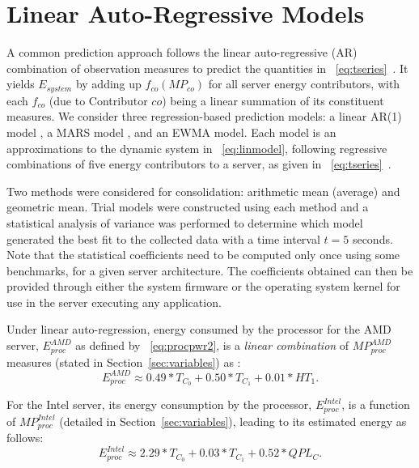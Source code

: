 \section{Linear Auto-Regressive Models}
\label{sec:linear-auto}

A common prediction approach follows the linear auto-regressive (AR)
combination of observation measures to predict the quantities in
\equationname~\eqref{eq:tseries}\ \cite{Lewis2008}.
It yields $E_{system}$ by adding up $f_{co}(MP_{co})$ for all server energy
contributors, with each $f_{co}$ (due to Contributor $co$) being a
linear summation of its constituent measures.
We consider three regression-based prediction models: a linear
AR(1) model \cite{Box1994}, a MARS model \cite{Friedman1991}, and an
EWMA model. 
Each model is an  approximations to the dynamic system in
\equationname~\eqref{eq:linmodel}, following regressive combinations of
five energy contributors to a server, as given in 
\equationname~\eqref{eq:tseries}\ \cite{Lewis2008}.

Two methods were considered for consolidation:
arithmetic mean (average) and geometric mean.  Trial models were
constructed using each method and a statistical analysis of variance was
performed to determine which model generated the best fit to the
collected data with a time interval $t=5$ seconds.  Note that the
statistical coefficients need to be computed only once using some
benchmarks, for a given server architecture.  The coefficients obtained
can then be provided through either the system firmware or the operating
system kernel for use in the server executing any application.

Under linear auto-regression, energy consumed by the processor for the
AMD server, $E_{proc}^{AMD}$ as defined by
\equationname~\eqref{eq:procpwr2}, is a \textit{linear combination} of
$MP_{proc}^{AMD}$ measures (stated in Section~\ref{sec:variables}) as \cite{Lewis2008}:
\begin{equation*}
  \label{eq:apxproc}
  E_{proc}^{AMD} \approx 0.49*T_{C_{0}}+0.50*T_{C_{1}}+0.01*HT_{1}. 
\end{equation*}

For the Intel server, its energy consumption by the processor,
$E_{proc}^{Intel}$, is a function of $MP_{proc}^{Intel}$ (detailed in
Section~\ref{sec:variables}), leading to its estimated energy as follows:
\begin{equation*}
  \label{eq:apxpr}
  E_{proc}^{Intel} \approx 2.29*T_{C_{0}}+0.03*T_{C_{1}}+0.52*QPL_{C}.
\end{equation*}
 
